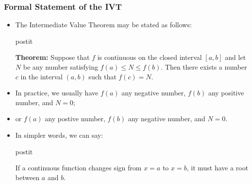 \documentclass[serif,ignorenonframetext]{beamer}
\begin{document}
\begin{frame}
\begin{columns}
  \end{columns}
\end{frame}

\begin{frame}
  \frametitle{Formal Statement of the IVT}
  \begin{itemize}
  \item The Intermediate Value Theorem may be stated as follows:
  \begin{beamercolorbox}{postit}

    \textbf{Theorem:} Suppose that $f$ is continuous on the closed
    interval $[a,b]$ and let $N$ be any number satisfying $f(a)\le N\le f(b)$.
    Then there exists a number $c$ in the interval $(a,b)$ such that $f(c)=N$.

  \end{beamercolorbox}
  \pause
  \item In practice, we usually have $f(a)$ any negative number,
    $f(b)$ any positive number, and $N=0$;
  \pause
  \item or $f(a)$ any postive number, $f(b)$ any negative number, and $N=0$.
  \pause
  \item In simpler words, we can say: 
    \begin{beamercolorbox}{postit}

      If a continuous function changes sign from
      $x=a$ to $x=b$, it must have a root between $a$ and $b$.


    \end{beamercolorbox}

  \end{itemize}
\end{frame}
\end{document}
